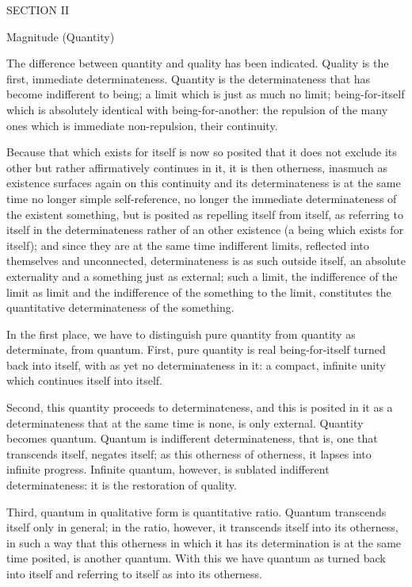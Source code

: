 SECTION II

Magnitude (Quantity)

The difference between quantity and quality has been indicated.
Quality is the first, immediate determinateness.
Quantity is the determinateness that
has become indifferent to being;
a limit which is just as much no limit;
being-for-itself which is absolutely
identical with being-for-another:
the repulsion of the many ones
which is immediate non-repulsion,
their continuity.

Because that which exists for itself is now so posited
that it does not exclude its other
but rather affirmatively continues in it,
it is then otherness, inasmuch as
existence surfaces again on this continuity
and its determinateness is at the same time
no longer simple self-reference,
no longer the immediate determinateness
of the existent something,
but is posited as repelling itself from itself,
as referring to itself in the determinateness
rather of an other existence
(a being which exists for itself);
and since they are at the same time indifferent limits,
reflected into themselves and unconnected,
determinateness is as such outside itself,
an absolute externality and a something just as external;
such a limit, the indifference of the limit as limit
and the indifference of the something to the limit,
constitutes the quantitative determinateness of the something.

In the first place, we have to distinguish pure quantity
from quantity as determinate, from quantum.
First, pure quantity is real being-for-itself
turned back into itself, with as yet no determinateness in it:
a compact, infinite unity which continues itself into itself.

Second, this quantity proceeds to determinateness,
and this is posited in it as a determinateness
that at the same time is none, is only external.
Quantity becomes quantum.
Quantum is indifferent determinateness,
that is, one that transcends itself, negates itself;
as this otherness of otherness, it lapses into infinite progress.
Infinite quantum, however, is sublated indifferent determinateness:
it is the restoration of quality.

Third, quantum in qualitative form is quantitative ratio.
Quantum transcends itself only in general;
in the ratio, however, it transcends itself into its otherness,
in such a way that this otherness in which it has its determination
is at the same time posited, is another quantum.
With this we have quantum as turned back into itself
and referring to itself as into its otherness.

